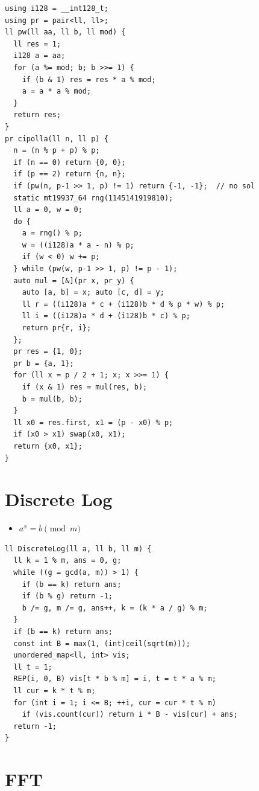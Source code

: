 \documentclass[10pt, a4paper, twocolumn]{article}
\begin{document}
\begin{verbatim}
using i128 = __int128_t;
using pr = pair<ll, ll>;
ll pw(ll aa, ll b, ll mod) {
  ll res = 1;
  i128 a = aa;
  for (a %= mod; b; b >>= 1) {
    if (b & 1) res = res * a % mod;
    a = a * a % mod;
  }
  return res;
}
pr cipolla(ll n, ll p) {
  n = (n % p + p) % p;
  if (n == 0) return {0, 0};
  if (p == 2) return {n, n};
  if (pw(n, p-1 >> 1, p) != 1) return {-1, -1};  // no sol
  static mt19937_64 rng(1145141919810);
  ll a = 0, w = 0;
  do {
    a = rng() % p;
    w = ((i128)a * a - n) % p;
    if (w < 0) w += p;
  } while (pw(w, p-1 >> 1, p) != p - 1);
  auto mul = [&](pr x, pr y) {
    auto [a, b] = x; auto [c, d] = y;
    ll r = ((i128)a * c + (i128)b * d % p * w) % p;
    ll i = ((i128)a * d + (i128)b * c) % p;
    return pr{r, i};
  };
  pr res = {1, 0};
  pr b = {a, 1};
  for (ll x = p / 2 + 1; x; x >>= 1) {
    if (x & 1) res = mul(res, b);
    b = mul(b, b);
  }
  ll x0 = res.first, x1 = (p - x0) % p;
  if (x0 > x1) swap(x0, x1);
  return {x0, x1};
}
\end{verbatim}

\section{Discrete Log}

\begin{itemize}[tight_item]
  \item $a ^ x = b \pmod m$
\end{itemize}

\begin{verbatim}
ll DiscreteLog(ll a, ll b, ll m) {
  ll k = 1 % m, ans = 0, g;
  while ((g = gcd(a, m)) > 1) {
    if (b == k) return ans;
    if (b % g) return -1;
    b /= g, m /= g, ans++, k = (k * a / g) % m;
  }
  if (b == k) return ans;
  const int B = max(1, (int)ceil(sqrt(m)));
  unordered_map<ll, int> vis;
  ll t = 1;
  REP(i, 0, B) vis[t * b % m] = i, t = t * a % m;
  ll cur = k * t % m;
  for (int i = 1; i <= B; ++i, cur = cur * t % m)
    if (vis.count(cur)) return i * B - vis[cur] + ans;
  return -1;
}
\end{verbatim}

\section{FFT}
\end{document}
